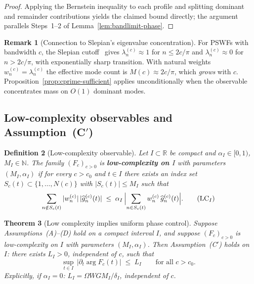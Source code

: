 \documentclass[12pt,a4paper]{amsart}
\newtheorem{theorem}{Theorem}[section]
\newtheorem{definition}[theorem]{Definition}
\theoremstyle{definition}
\newtheorem{remark}[theorem]{Remark}
\begin{document}
\begin{proof}
Applying the Bernstein inequality to each profile and
splitting dominant and remainder contributions yields
the claimed bound directly; the argument parallels
Steps~1--2 of Lemma~\ref{lem:bandlimit-phase}.
\end{proof}

\begin{remark}[Connection to Slepian's eigenvalue
concentration]
\label{rem:slepian-cutoff}
For PSWFs with bandwidth $c$, the Slepian
cutoff~\cite{Slepian1964} gives
$\lambda_n^{(c)} \approx 1$ for $n \le 2c/\pi$ and
$\lambda_n^{(c)} \approx 0$ for $n > 2c/\pi$, with
exponentially sharp transition. With natural weights
$w_n^{(c)} = \lambda_n^{(c)}$ the effective mode count
is $M(c) \approx 2c/\pi$, which \emph{grows} with $c$.
Proposition~\ref{prop:cprime-sufficient} applies
unconditionally when the observable concentrates mass
on $O(1)$ dominant modes.
\end{remark}

\subsection{Low-complexity observables and
Assumption~\texorpdfstring{(C$'$)}{(C')}}
\label{ssec:low-complexity}

\begin{definition}[Low-complexity observable]
\label{def:low-complexity}
Let $I \subset \mathbb{R}$ be compact and
$\alpha_I \in [0,1)$, $M_I \in \mathbb{N}$.
The family $(F_c)_{c>0}$ is
\textbf{low-complexity on $I$} with parameters
$(M_I, \alpha_I)$ if for every $c > c_0$ and
$t \in I$ there exists an index set
$S_c(t) \subset \{1,\ldots,N(c)\}$ with
$|S_c(t)| \le M_I$ such that
\begin{equation}
\label{eq:LC}
\sum_{n \notin S_c(t)}
|w_n^{(c)}|\,|\widehat{g}_n^{(c)}(t)|
\;\le\;
\alpha_I \,
\Bigl|\sum_{n \in S_c(t)}
w_n^{(c)}\,\widehat{g}_n^{(c)}(t)\Bigr|.
\tag{LC$_I$}
\end{equation}
\end{definition}

\begin{theorem}[Low complexity implies uniform phase
control]
\label{thm:LC-implies-Cprime}
Suppose Assumptions~\textnormal{(A)--(D)} hold on a
compact interval $I$, and suppose $(F_c)_{c>0}$ is
low-complexity on $I$ with parameters
$(M_I, \alpha_I)$. Then
Assumption~\textnormal{(C$'$)} holds on $I$: there
exists $L_I > 0$, independent of $c$, such that
\[
\sup_{t \in I}\,
|\partial_t \arg F_c(t)| \;\le\; L_I
\qquad \text{for all } c > c_0.
\]
Explicitly, if $\alpha_I = 0$:
$L_I = \Omega W G M_I / \delta_I$,
independent of $c$.
\end{theorem}
\end{document}
